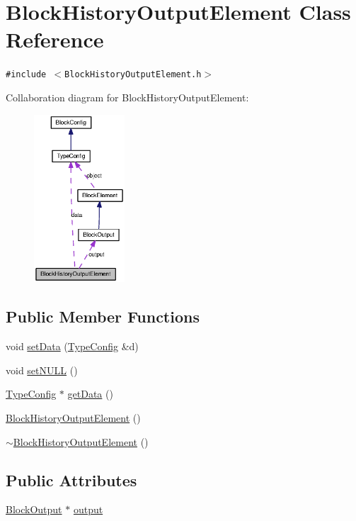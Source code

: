 \hypertarget{classBlockHistoryOutputElement}{
\section{BlockHistoryOutputElement Class Reference}
\label{classBlockHistoryOutputElement}
}
{\tt \#include $<$BlockHistoryOutputElement.h$>$}

Collaboration diagram for BlockHistoryOutputElement:\nopagebreak
\begin{figure}[H]
\begin{center}
\leavevmode
\includegraphics[width=96pt]{classBlockHistoryOutputElement__coll__graph}
\end{center}
\end{figure}
\subsection*{Public Member Functions}
\begin{CompactItemize}
\item 
void \hyperlink{classBlockHistoryOutputElement_c6a108725145c059f2c3caa4740f7fab}{setData} (\hyperlink{classTypeConfig}{TypeConfig} \&d)
\item 
void \hyperlink{classBlockHistoryOutputElement_18ce3d2033c394df5c9e478b97f3d4eb}{setNULL} ()
\item 
\hyperlink{classTypeConfig}{TypeConfig} $\ast$ \hyperlink{classBlockHistoryOutputElement_5c3aada39e483d277c9b52c0a4b3c549}{getData} ()
\item 
\hyperlink{classBlockHistoryOutputElement_08ab623b57a5a66e65042064c64134c3}{BlockHistoryOutputElement} ()
\item 
\hyperlink{classBlockHistoryOutputElement_80f68f40d930d60dddae536a7acb08bf}{$\sim$BlockHistoryOutputElement} ()
\end{CompactItemize}
\subsection*{Public Attributes}
\begin{CompactItemize}
\item 
\hyperlink{classBlockOutput}{BlockOutput} $\ast$ \hyperlink{classBlockHistoryOutputElement_3bd188f07c6e29c45ebd043c9a8bd755}{output}
\end{CompactItemize}

